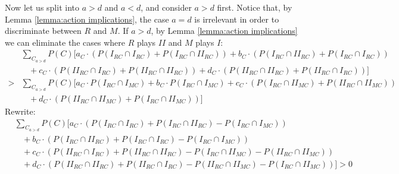 \documentclass[fleqn,reqno,11pt]{article}
\begin{document}
\noindent Now let us split into $a>d$ and $a<d$, and consider $a>d$ first.  Notice that, by
Lemma \ref{lemma:action implications}, the case $a=d$ is irrelevant in order to discriminate
between $R$ and $M$. If $a>d$, by Lemma \ref{lemma:action implications} we can eliminate the
cases where $R$ plays $II$ and $M$ plays $I$:
\begin{align*}
  & \textstyle{\sum_{C_{a>d}}} P(C)[a_{C} \cdot (P(I_{RC}\cap I_{RC}) + P(I_{RC}\cap II_{RC})) + b_{C} \cdot
  (P(I_{RC}\cap II_{RC}) + P(I_{RC}\cap I_{RC})) \\ 
  & \ \ \ \ + c_{C} \cdot (P(II_{RC}\cap I_{RC})
  +P(II_{RC}\cap II_{RC})) + d_{C} \cdot (P(II_{RC}\cap II_{RC})+P(II_{RC}\cap I_{RC}))] \\
  > & 
  \textstyle{\sum_{C_{a>d}}} P(C)[a_{C} \cdot P(I_{RC}\cap I_{MC}) + b_{C} \cdot P(I_{RC}\cap I_{MC}) +
  c_{C} \cdot (P(I_{RC}\cap II_{MC})+P(II_{RC}\cap II_{MC})) \\ 
  & \ \ \ \ + d_{C} \cdot (P(II_{RC}\cap
  II_{MC})+P(I_{RC}\cap II_{MC}))]
\end{align*}
Rewrite:
\begin{align*}
  & \textstyle{\sum_{C_{a>d}}} P(C)[a_{C} \cdot (P(I_{RC}\cap I_{RC}) + P(I_{RC}\cap II_{RC})-
  P(I_{RC}\cap I_{MC})) \\ 
  & \ \ \ \ + b_{C} \cdot (P(I_{RC}\cap II_{RC}) + P(I_{RC}\cap I_{RC})-
  P(I_{RC}\cap I_{MC})) \\ 
  & \ \ \ \ + c_{C} \cdot (P(II_{RC}\cap I_{RC}) +P(II_{RC}\cap II_{RC})-
  P(I_{RC}\cap II_{MC})- P(II_{RC}\cap II_{MC})) \\ 
  & \ \ \ \ + d_{C} \cdot (P(II_{RC}\cap
  II_{RC})+P(II_{RC}\cap I_{RC})- P(II_{RC}\cap II_{MC})- P(I_{RC}\cap II_{MC}))]> 0
\end{align*}
\end{document}
